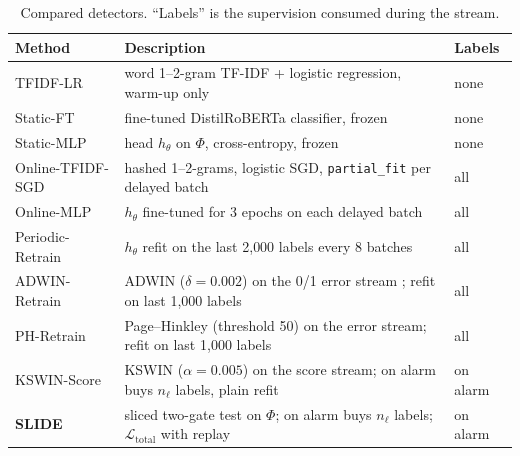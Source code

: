 \begin{table}[t]
\centering
\caption{Compared detectors. ``Labels'' is the supervision consumed during the stream.}
\label{tab:methods}
\scriptsize
\setlength{\tabcolsep}{3pt}
\begin{tabular}{@{}>{\raggedright\arraybackslash}p{2.8cm}>{\raggedright\arraybackslash}p{9.5cm}l@{}}
\toprule
Method & Description & Labels \\
\midrule
TFIDF-LR & word 1--2-gram TF-IDF + logistic regression, warm-up only & none \\
Static-FT & fine-tuned DistilRoBERTa classifier, frozen & none \\
Static-MLP & head $h_\theta$ on $\Phi$, cross-entropy, frozen & none \\
Online-TFIDF-SGD & hashed 1--2-grams, logistic SGD, \texttt{partial\_fit} per delayed batch & all \\
Online-MLP & $h_\theta$ fine-tuned for 3 epochs on each delayed batch & all \\
Periodic-Retrain & $h_\theta$ refit on the last 2{,}000 labels every 8 batches & all \\
ADWIN-Retrain & ADWIN ($\delta=0.002$) on the 0/1 error stream \cite{bifet2007}; refit on last 1{,}000 labels & all \\
PH-Retrain & Page--Hinkley (threshold 50) on the error stream; refit on last 1{,}000 labels & all \\
KSWIN-Score & KSWIN ($\alpha=0.005$) \cite{raab2020} on the score stream; on alarm buys $n_\ell$ labels, plain refit & on alarm \\
\textbf{SLIDE} & sliced two-gate test on $\Phi$; on alarm buys $n_\ell$ labels; $\mathcal{L}_{\mathrm{total}}$ with replay & on alarm \\
\bottomrule
\end{tabular}
\end{table}
